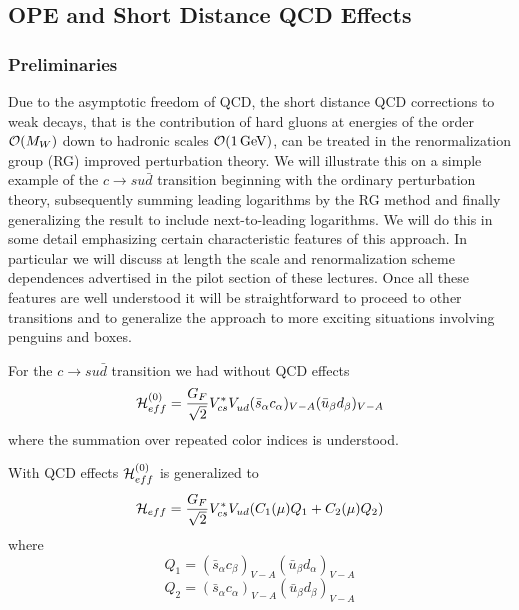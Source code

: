 \documentclass[12pt]{article}
\newcommand{\gev}{\, {\rm GeV}}
\newcommand{\ord}{{\cal O}}
\begin{document}
\begin{itemize}
\begin{itemize}
\begin{itemize}
\subsection{OPE and Short Distance QCD Effects}
            \label{sec:basicform:ope}
\subsubsection{Preliminaries}
Due to the asymptotic freedom of QCD, the short distance
QCD corrections to weak decays, that is the contribution
of hard gluons at energies of the order $\ord(M_W)$ down to hadronic
scales $\ord(1\gev)$, can be treated  in 
the renormalization group (RG) improved perturbation theory. 
We will illustrate this on a simple example of the
$c\to su\bar d$ transition beginning with the ordinary
perturbation theory, subsequently summing leading logarithms
by the RG method and finally generalizing the result to include
next-to-leading logarithms. We will do this in some detail
emphasizing certain characteristic features of this approach.
In particular we will discuss at length the scale and
renormalization scheme dependences advertised in the pilot
section of these lectures. Once all these features are well
understood it will be straightforward to proceed to other
transitions and to generalize the approach to more exciting
situations involving penguins and boxes.

For the $c\to su\bar d$ transition we had without QCD effects
\begin{equation}\label{amp0}
{\cal H}^{(0)}_{eff}={G_F\over\sqrt{2}}V^*_{cs}V_{ud}^{}
  (\bar s_\alpha c_\alpha)_{V-A}(\bar u_\beta d_\beta)_{V-A}
\end{equation}
where the summation over repeated color indices is understood.  

With QCD effects ${\cal H}^{(0)}_{eff}$ is generalized to
\begin{equation}\label{hq12}
{\cal H}_{eff}={G_F\over\sqrt{2}}V^\ast_{cs}V_{ud}
(C_1(\mu) Q_1+C_2(\mu) Q_2) 
\end{equation}
where
\begin{equation}\label{q1c} Q_1=
(\bar s_\alpha c_\beta)_{V-A}(\bar u_\beta d_\alpha)_{V-A}  
 \end{equation}
\begin{equation}\label{q2c} Q_2
=(\bar s_\alpha c_\alpha)_{V-A}(\bar u_\beta d_\beta)_{V-A}
  \end{equation}


\end{itemize}
\end{itemize}
\end{itemize}
\end{document}
